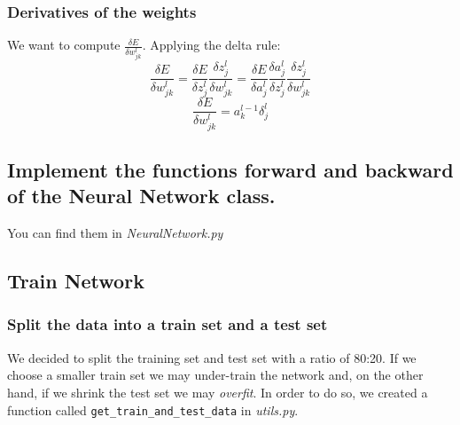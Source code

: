 \documentclass[11pt]{article}
\begin{document}
\subsubsection{Derivatives of the weights}
We want to compute $\frac{\delta E}{\delta w^l_{jk}}$. Applying the delta rule:
\begin{equation}
\frac{\delta E}{\delta w^l_{jk}} = \frac{\delta E}{\delta z^l_j}\frac{\delta z^l_j}{\delta w^l_{jk}} =	
\frac{\delta E}{\delta a^l_j}\frac{\delta a^l_j}{\delta z^l_{j}}
\frac{\delta z^l_j}{\delta w^l_{jk}}
\end{equation}
\begin{equation}
\label{eq:derivativesWeigthDeltas}	
\frac{\delta E}{\delta w^l_{jk}} = a^{l-1}_k \delta^l_j
\end{equation}
\subsection{Implement the functions forward and backward of the Neural Network class.}
You can find them in \emph{NeuralNetwork.py}
\subsection{Train Network}
\subsubsection{ Split the data into a train set and a test set}
We decided to split the training set and test set with a ratio of 80:20. If we choose a smaller train set we may under-train the network and, on the other hand, if we shrink the test set we may \emph{overfit}. In order to do so, we created a function called \texttt{get\_train\_and\_test\_data} in \emph{utils.py}.
\end{document}

